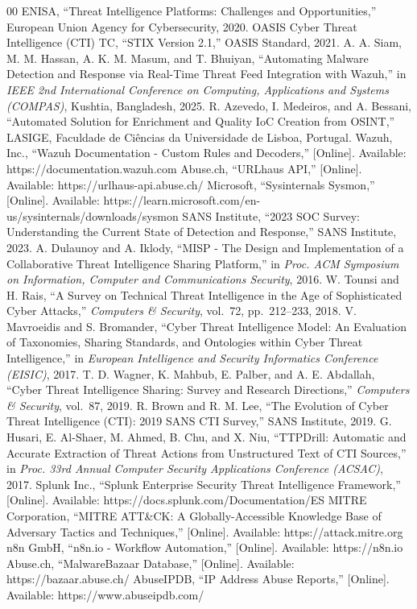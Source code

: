 \documentclass[conference]{IEEEtran}
\begin{document}
\begin{thebibliography}{00}
 ENISA, ``Threat Intelligence Platforms: Challenges and Opportunities,'' European Union Agency for Cybersecurity, 2020.
 OASIS Cyber Threat Intelligence (CTI) TC, ``STIX Version 2.1,'' OASIS Standard, 2021.
 A. A. Siam, M. M. Hassan, A. K. M. Masum, and T. Bhuiyan, ``Automating Malware Detection and Response via Real-Time Threat Feed Integration with Wazuh,'' in \textit{IEEE 2nd International Conference on Computing, Applications and Systems (COMPAS)}, Kushtia, Bangladesh, 2025.
 R. Azevedo, I. Medeiros, and A. Bessani, ``Automated Solution for Enrichment and Quality IoC Creation from OSINT,'' LASIGE, Faculdade de Ciências da Universidade de Lisboa, Portugal.
 Wazuh, Inc., ``Wazuh Documentation - Custom Rules and Decoders,'' [Online]. Available: https://documentation.wazuh.com
 Abuse.ch, ``URLhaus API,'' [Online]. Available: https://urlhaus-api.abuse.ch/
 Microsoft, ``Sysinternals Sysmon,'' [Online]. Available: https://learn.microsoft.com/en-us/sysinternals/downloads/sysmon
 SANS Institute, ``2023 SOC Survey: Understanding the Current State of Detection and Response,'' SANS Institute, 2023.
 A. Dulaunoy and A. Iklody, ``MISP - The Design and Implementation of a Collaborative Threat Intelligence Sharing Platform,'' in \textit{Proc. ACM Symposium on Information, Computer and Communications Security}, 2016.
 W. Tounsi and H. Rais, ``A Survey on Technical Threat Intelligence in the Age of Sophisticated Cyber Attacks,'' \textit{Computers \& Security}, vol.~72, pp.~212--233, 2018.
 V. Mavroeidis and S. Bromander, ``Cyber Threat Intelligence Model: An Evaluation of Taxonomies, Sharing Standards, and Ontologies within Cyber Threat Intelligence,'' in \textit{European Intelligence and Security Informatics Conference (EISIC)}, 2017.
 T. D. Wagner, K. Mahbub, E. Palber, and A. E. Abdallah, ``Cyber Threat Intelligence Sharing: Survey and Research Directions,'' \textit{Computers \& Security}, vol.~87, 2019.
 R. Brown and R. M. Lee, ``The Evolution of Cyber Threat Intelligence (CTI): 2019 SANS CTI Survey,'' SANS Institute, 2019.
 G. Husari, E. Al-Shaer, M. Ahmed, B. Chu, and X. Niu, ``TTPDrill: Automatic and Accurate Extraction of Threat Actions from Unstructured Text of CTI Sources,'' in \textit{Proc. 33rd Annual Computer Security Applications Conference (ACSAC)}, 2017.
 Splunk Inc., ``Splunk Enterprise Security Threat Intelligence Framework,'' [Online]. Available: https://docs.splunk.com/Documentation/ES
 MITRE Corporation, ``MITRE ATT\&CK: A Globally-Accessible Knowledge Base of Adversary Tactics and Techniques,'' [Online]. Available: https://attack.mitre.org
 n8n GmbH, ``n8n.io - Workflow Automation,'' [Online]. Available: https://n8n.io
 Abuse.ch, ``MalwareBazaar Database,'' [Online]. Available: https://bazaar.abuse.ch/
 AbuseIPDB, ``IP Address Abuse Reports,'' [Online]. Available: https://www.abuseipdb.com/
\end{thebibliography}
\end{document}
